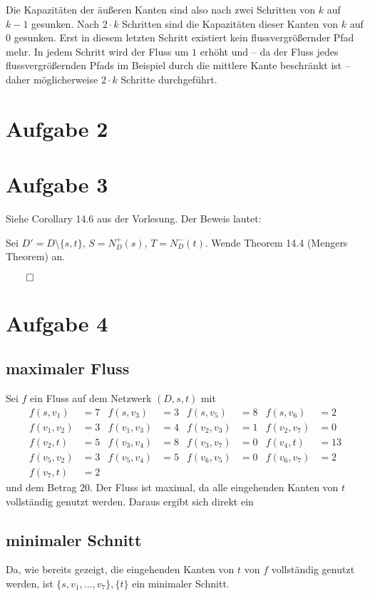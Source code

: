 \documentclass[a4paper]{article}
\begin{document}
Die Kapazitäten der äußeren Kanten sind also nach zwei Schritten von $k$
auf $k-1$ gesunken. Nach $2 \cdot k$ Schritten sind die Kapazitäten dieser
Kanten von $k$ auf $0$ gesunken. Erst in diesem letzten Schritt existiert
kein flussvergrößernder Pfad mehr. In jedem Schritt wird der Fluss um $1$
erhöht und -- da der Fluss jedes flussvergrößernden Pfads im Beispiel durch 
die mittlere Kante beschränkt ist -- daher möglicherweise $2 \cdot k$ Schritte
durchgeführt.

\section{Aufgabe 2}

\section{Aufgabe 3}

Siehe Corollary 14.6 aus der Vorlesung.
Der Beweis lautet:

Sei $D' = D \setminus \{s, t\}$, $S = N^+_D(s)$, $T = N^-_D(t)$.
Wende Theorem 14.4 (Mengers Theorem) an.

$\qed$

\section{Aufgabe 4}

\subsection{maximaler Fluss}
Sei $f$ ein Fluss auf dem Netzwerk $(D, s, t)$ mit
\begin{align*}
f(s, v_1) &= 7 		& f(s, v_3) &= 3 	& f(s, v_5) &= 8 	& f(s, v_6) &= 2 \\
f(v_1, v_2) &= 3 	& f(v_1, v_3) &= 4	& f(v_2, v_3) &= 1	& f(v_2, v_7) &= 0 \\
f(v_2, t) &= 5		& f(v_3, v_4) &= 8	& f(v_3, v_7) &= 0	& f(v_4, t) &= 13 \\
f(v_5, v_2) &= 3	& f(v_5, v_4) &= 5	& f(v_6, v_5) &= 0	& f(v_6, v_7) &= 2 \\
f(v_7, t) &= 2
\end{align*}
und dem Betrag $20$. Der Fluss ist maximal, da alle eingehenden Kanten von $t$
vollständig genutzt werden. Daraus ergibt sich direkt ein
\subsection{minimaler Schnitt}
Da, wie bereits gezeigt, die eingehenden Kanten von $t$ von $f$ vollständig
genutzt werden, ist $\{s, v_1, ..., v_7\}, \{t\}$ ein minimaler Schnitt.
\end{document}
